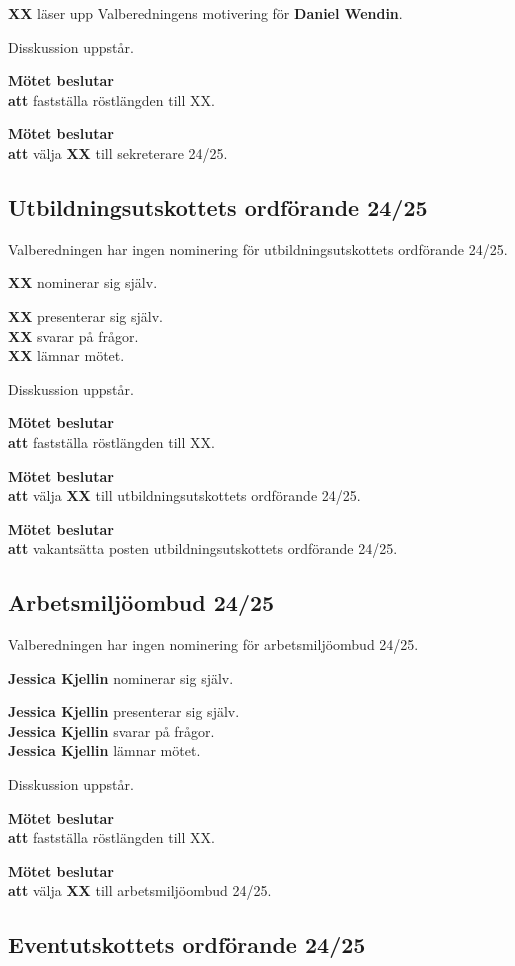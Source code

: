 \documentclass{datateknologsektionen-document}
\newcommand{\ind}{\hspace*{2em}}
\newcommand{\motetbeslutar}{\textbf{Mötet beslutar}}
\newcommand{\att}{\\\ind\textbf{att}}
\begin{document}
\textbf{XX} läser upp Valberedningens motivering för \textbf{Daniel Wendin}.

Disskussion uppstår.

\motetbeslutar
\att{} fastställa röstlängden till XX.

\motetbeslutar
\att{} välja \textbf{XX} till sekreterare 24/25.

\subsection{Utbildningsutskottets ordförande 24/25}

Valberedningen har ingen nominering för utbildningsutskottets ordförande 24/25.

\textbf{XX} nominerar sig själv.

\textbf{XX} presenterar sig själv.\\
\textbf{XX} svarar på frågor.\\
\textbf{XX} lämnar mötet.

Disskussion uppstår.

\motetbeslutar
\att{} fastställa röstlängden till XX.

\motetbeslutar
\att{} välja \textbf{XX} till utbildningsutskottets ordförande 24/25.

\motetbeslutar
\att{} vakantsätta posten utbildningsutskottets ordförande 24/25.

\subsection{Arbetsmiljöombud 24/25}

Valberedningen har ingen nominering för arbetsmiljöombud 24/25.

\textbf{Jessica Kjellin} nominerar sig själv.

\textbf{Jessica Kjellin} presenterar sig själv.\\
\textbf{Jessica Kjellin} svarar på frågor.\\
\textbf{Jessica Kjellin} lämnar mötet.

Disskussion uppstår.

\motetbeslutar
\att{} fastställa röstlängden till XX.

\motetbeslutar
\att{} välja \textbf{XX} till arbetsmiljöombud 24/25.

\subsection{Eventutskottets ordförande 24/25}
\end{document}
